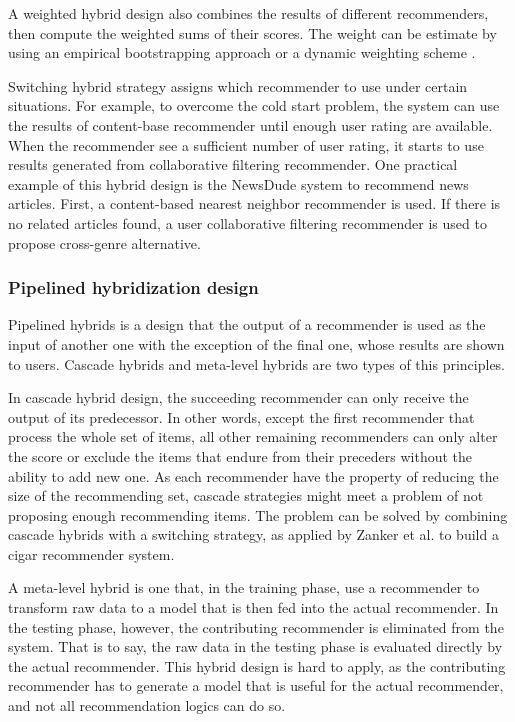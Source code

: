 A weighted hybrid design also combines the results of different recommenders, then compute the weighted sums of their scores. The weight can be estimate by using an empirical bootstrapping approach \cite{zanker2009case} or a dynamic weighting scheme \cite{claypool1999combing}. 

Switching hybrid strategy assigns which recommender to use under certain situations. For example, to overcome the cold start problem, the system can use the results of content-base recommender until enough user rating are available. When the recommender see a sufficient number of user rating, it starts to use results generated from collaborative filtering recommender. One practical example of this hybrid design is the NewsDude system \cite{billsus2000user} to recommend news articles. First, a content-based nearest neighbor recommender is used. If there is no related articles found, a user collaborative filtering recommender is used to propose cross-genre alternative.

\subsubsection{Pipelined hybridization design}
Pipelined hybrids is a design that the output of a recommender is used as the input of another one with the exception of the final one, whose results are shown to users. Cascade hybrids and meta-level hybrids are two types of this principles. 

In cascade hybrid design, the succeeding recommender can only receive the output of its predecessor. In other words, except the first recommender that process the whole set of items, all other remaining recommenders can only alter the score or exclude the items that endure from their preceders without the ability to add new one. As each recommender have the property of reducing the size of the recommending set, cascade strategies might meet a problem of not proposing enough recommending items. The problem can be solved by combining cascade hybrids with a switching strategy, as applied by Zanker et al. \cite{zanker2009case} to build a cigar recommender system. 

A meta-level hybrid is one that, in the training phase, use a recommender to transform raw data to a model that is then fed into the actual recommender. In the testing phase, however, the contributing recommender is eliminated from the system. That is to say, the raw data in the testing phase is evaluated directly by the actual recommender. This hybrid design is hard to apply, as the contributing recommender has to generate a model that is useful for the actual recommender, and not all recommendation logics can do so.

